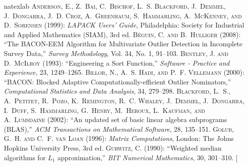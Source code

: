 \documentclass[a4paper,oneside,11pt,DIV=12]{scrartcl}
\begin{document}
\begin{thebibliography}{14}
\newcommand{\enquote}[1]{``#1''}
\expandafter\ifx\csname natexlab\endcsname\relax\def\natexlab#1{#1}\fi
{}
	\textsc{Anderson, E., Z.~Bai, C.~Bischof, L.~S. Blackford, J.~Demmel,
	J.~Dongarra, J.~D. Croz, A.~Greenhaum, S.~Hammarling, A.~McKenney, and
	D.~Sorensen} (1999): \emph{{LAPACK} Users' Guide}, Philadelphia: Society
	for Industrial and Applied Mathematics (SIAM), 3rd ed.
	\textsc{B\'{e}guin, C. and B.~Hulliger} (2008): \enquote{The BACON-EEM
	Algorithm for Multivariate Outlier Detection in Incomplete Survey Data,}
	\emph{Survey Methodology}, Vol. 34, No. 1, 91--103.
	\textsc{Bentley, J. and D.~McIlroy} (1993): \enquote{Engineering a Sort
	Function,} \emph{Software - Practice and Experience}, 23, 1249--1265.
	\textsc{Billor, N., A.~S. Hadi, and P.~F. Vellemann} (2000):
	\enquote{{BACON}: Blocked Adaptive Computationally-efficient Outlier
	Nominators,} \emph{Computational Statistics and Data Analysis}, 34,
	279--298.
	\textsc{Blackford, L.~S., A.~Petitet, R.~Pozo, K.~Remington, R.~C. Whaley,
	J.~Demmel, J.~Dongarra, I.~Duff, S.~Hammarling, G.~Henry, M.~Heroux,
	L.~Kaufman, and A.~Lumsdaine} (2002): \enquote{An updated set of basic
	linear algebra subprograms ({BLAS}),} \emph{ACM Transactions on
	Mathematical Software}, 28, 135--151.
	\textsc{Golub, G.~H. and C.~F. van Loan} (1996): \emph{Matrix Computations},
	London: The Johns Hopkins University Press, 3rd ed.
	\textsc{Gurwitz, C.} (1990): \enquote{Weighted median algorithms for $L_1$
	approximation,} \emph{BIT Numerical Mathematics}, 30, 301--310.
\bibitem[\protect{}
\end{thebibliography}
\end{document}
